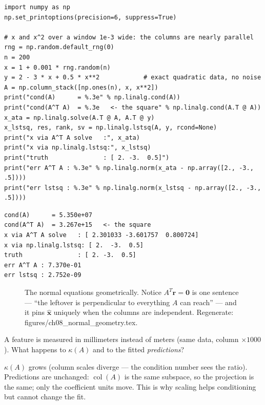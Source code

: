 \begin{lstlisting}[caption={\ttfamily code/ch08\_ata\_vs\_lstsq.py ---
same problem, two routes; the condition square is visible in the answer.}]
import numpy as np
np.set_printoptions(precision=6, suppress=True)

# x and x^2 over a window 1e-3 wide: the columns are nearly parallel
rng = np.random.default_rng(0)
n = 200
x = 1 + 0.001 * rng.random(n)
y = 2 - 3 * x + 0.5 * x**2            # exact quadratic data, no noise
A = np.column_stack([np.ones(n), x, x**2])
print("cond(A)      = %.3e" % np.linalg.cond(A))
print("cond(A^T A)  = %.3e   <- the square" % np.linalg.cond(A.T @ A))
x_ata = np.linalg.solve(A.T @ A, A.T @ y)
x_lstsq, res, rank, sv = np.linalg.lstsq(A, y, rcond=None)
print("x via A^T A solve   :", x_ata)
print("x via np.linalg.lstsq:", x_lstsq)
print("truth               : [ 2. -3.  0.5]")
print("err A^T A : %.3e" % np.linalg.norm(x_ata - np.array([2., -3., .5])))
print("err lstsq : %.3e" % np.linalg.norm(x_lstsq - np.array([2., -3., .5])))
\end{lstlisting}

\begin{lstlisting}[caption={Output of the two-route comparison. The
computed $\kappa(A^{T}A)=3.267\times10^{15}$ is float64's own answer ---
about 14\% off the exact square $2.86\times10^{15}$, because the product
matrix is already so ill-conditioned that even its condition number
loses precision. Either way the $A^{T}A$ answer visibly differs from
truth while lstsq is exact. Same math, different arithmetic.}]
cond(A)      = 5.350e+07
cond(A^T A)  = 3.267e+15   <- the square
x via A^T A solve   : [ 2.301033 -3.601757  0.800724]
x via np.linalg.lstsq: [ 2.  -3.  0.5]
truth               : [ 2. -3.  0.5]
err A^T A : 7.370e-01
err lstsq : 2.752e-09
\end{lstlisting}

\begin{figure}[htbp]
\centering

\caption{The normal equations geometrically. Notice $A^{T}\mathbf r=
\mathbf0$ is one sentence --- ``the leftover is perpendicular to
everything $A$ can reach'' --- and it pins $\hat{\mathbf x}$ uniquely
when the columns are independent. Regenerate:
\ttfamily figures/ch08\_normal\_geometry.tex.}
\label{fig:normal-geo}
\end{figure}

\begin{exercise}[medium]
A feature is measured in millimeters instead of meters (same data, column
$\times1000$). What happens to $\kappa(A)$ and to the fitted
\emph{predictions}?
\begin{solution}
$\kappa(A)$ grows (column scales diverge --- the condition number sees the
ratio). Predictions are unchanged: $\operatorname{col}(A)$ is the same
subspace, so the projection is the same; only the coefficient units move.
This is why scaling helps conditioning but cannot change the fit.
\end{solution}
\end{exercise}

